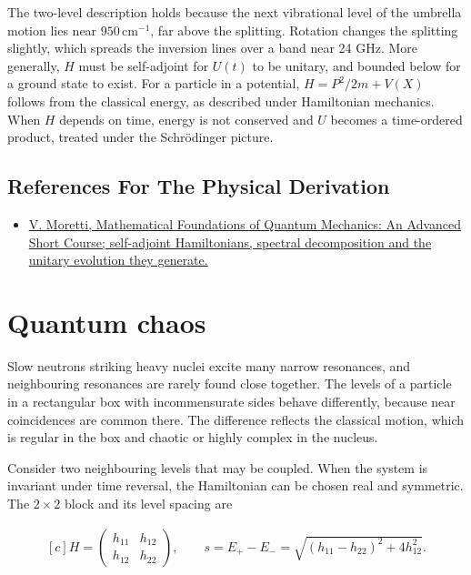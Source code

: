 \documentclass[11pt,oneside]{book}
\newenvironment{centeredalign}{\[\begin{gathered}[c]}{\end{gathered}\]}
\begin{document}
The two-level description holds because the next vibrational level of the umbrella motion lies near \(950\,\mathrm{cm}^{-1}\), far above the splitting. Rotation changes the splitting slightly, which spreads the inversion lines over a band near 24 GHz. More generally, \(H\) must be self-adjoint for \(U(t)\) to be unitary, and bounded below for a ground state to exist. For a particle in a potential, \(H=P^2/2m+V(X)\) follows from the classical energy, as described under Hamiltonian mechanics. When \(H\) depends on time, energy is not conserved and \(U\) becomes a time-ordered product, treated under the Schrödinger picture.

\subsection*{References For The Physical Derivation}
\begin{itemize}
\item \href{https://arxiv.org/abs/1508.06951}{V. Moretti, Mathematical Foundations of Quantum Mechanics: An Advanced Short Course; self-adjoint Hamiltonians, spectral decomposition and the unitary evolution they generate.}
\end{itemize}





\clearpage

\section{Quantum chaos}

\label{topic:quantum-chaos}

Slow neutrons striking heavy nuclei excite many narrow resonances, and neighbouring resonances are rarely found close together. The levels of a particle in a rectangular box with incommensurate sides behave differently, because near coincidences are common there. The difference reflects the classical motion, which is regular in the box and chaotic or highly complex in the nucleus.

Consider two neighbouring levels that may be coupled. When the system is invariant under time reversal, the Hamiltonian can be chosen real and symmetric. The \(2\times2\) block and its level spacing are

\begin{centeredalign}
H=\begin{pmatrix}h_{11}&h_{12}\\h_{12}&h_{22}\end{pmatrix},\qquad
s=E_+-E_-=\sqrt{(h_{11}-h_{22})^2+4h_{12}^2}.
\end{centeredalign}
\end{document}

